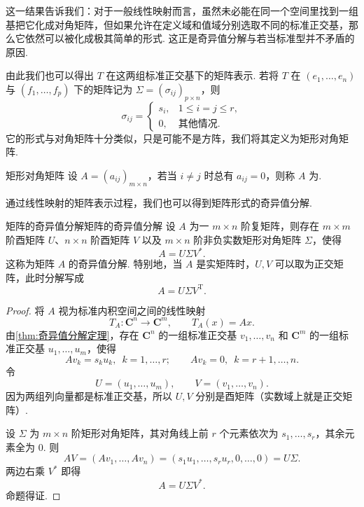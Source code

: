 这一结果告诉我们：对于一般线性映射而言，虽然未必能在同一个空间里找到一组基把它化成对角矩阵，但如果允许在定义域和值域分别选取不同的标准正交基，那么它依然可以被化成极其简单的形式. 这正是奇异值分解与若当标准型并不矛盾的原因.

由此我们也可以得出 $ T $ 在这两组标准正交基下的矩阵表示. 若将 $ T $ 在 $ (e_1, \ldots, e_n) $ 与 $ (f_1, \ldots, f_p) $ 下的矩阵记为 $ \Sigma = (\sigma_{ij})_{p \times n} $，则
\[
    \sigma_{ij} =
    \begin{cases}
        s_i, & 1 \leqslant i = j \leqslant r, \\
        0,   & \text{其他情况}.
    \end{cases}
\]
它的形式与对角矩阵十分类似，只是可能不是方阵，我们将其定义为矩形对角矩阵.

\begin{definition}{矩形对角矩阵}{} 
    设 $ A = (a_{ij})_{m \times n} $，若当 $ i \neq j $ 时总有 $ a_{ij} = 0 $，则称 $ A $ 为.
\end{definition}

通过线性映射的矩阵表示过程，我们也可以得到矩阵形式的奇异值分解.

\begin{theorem}{矩阵的奇异值分解}{矩阵的奇异值分解}
    设 $ A $ 为一 $ m \times n $ 阶复矩阵，则存在 $ m \times m $ 阶酉矩阵 $ U $、$ n \times n $ 阶酉矩阵 $ V $ 以及 $ m \times n $ 阶非负实数矩形对角矩阵 $ \Sigma $，使得
    \[
        A = U \Sigma V^*.
    \]
    这称为矩阵 $ A $ 的奇异值分解. 特别地，当 $ A $ 是实矩阵时，$ U, V $ 可以取为正交矩阵，此时分解写成
    \[
        A = U \Sigma V^{\mathrm{T}}.
    \]
\end{theorem}

\begin{proof}
    将 $ A $ 视为标准内积空间之间的线性映射
    \[
        T_A : \mathbf{C}^n \to \mathbf{C}^m,\qquad T_A(x) = Ax.
    \]
    由\autoref{thm:奇异值分解定理}，存在 $ \mathbf{C}^n $ 的一组标准正交基 $ v_1, \ldots, v_n $ 和 $ \mathbf{C}^m $ 的一组标准正交基 $ u_1, \ldots, u_m $，使得
    \[
        Av_k = s_k u_k,\enspace k = 1, \ldots, r;\qquad Av_k = 0,\enspace k = r+1, \ldots, n.
    \]
    令
    \[
        U = (u_1, \ldots, u_m),\qquad V = (v_1, \ldots, v_n).
    \]
    因为两组列向量都是标准正交基，所以 $ U, V $ 分别是酉矩阵（实数域上就是正交矩阵）.

    设 $ \Sigma $ 为 $ m \times n $ 阶矩形对角矩阵，其对角线上前 $ r $ 个元素依次为 $ s_1, \ldots, s_r $，其余元素全为 $ 0 $. 则
    \[
        AV = (Av_1, \ldots, Av_n) = (s_1u_1, \ldots, s_ru_r, 0, \ldots, 0) = U\Sigma.
    \]
    两边右乘 $ V^* $ 即得
    \[
        A = U\Sigma V^*.
    \]
    命题得证.
\end{proof}

